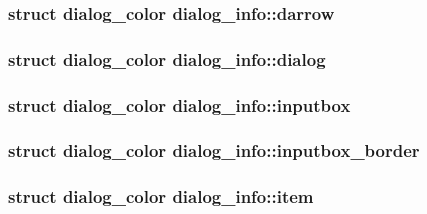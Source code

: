 \hypertarget{structdialog__info_a7e5d0d84cd0b3acd8805bfe8586d3f8e}{
\subsubsection[{darrow}]{\setlength{\rightskip}{0pt plus 5cm}struct {\bf dialog\-\_\-color} dialog\-\_\-info\-::darrow}}\label{structdialog__info_a7e5d0d84cd0b3acd8805bfe8586d3f8e}
\hypertarget{structdialog__info_a0b2621037998c327e6a4a4ea9a6edd0d}{
\subsubsection[{dialog}]{\setlength{\rightskip}{0pt plus 5cm}struct {\bf dialog\-\_\-color} dialog\-\_\-info\-::dialog}}\label{structdialog__info_a0b2621037998c327e6a4a4ea9a6edd0d}
\hypertarget{structdialog__info_addbd87e943da6bb0040fa62a45abd0ed}{
\subsubsection[{inputbox}]{\setlength{\rightskip}{0pt plus 5cm}struct {\bf dialog\-\_\-color} dialog\-\_\-info\-::inputbox}}\label{structdialog__info_addbd87e943da6bb0040fa62a45abd0ed}
\hypertarget{structdialog__info_a6f71cf10f00154ddb7485b217d92f8a7}{
\subsubsection[{inputbox\-\_\-border}]{\setlength{\rightskip}{0pt plus 5cm}struct {\bf dialog\-\_\-color} dialog\-\_\-info\-::inputbox\-\_\-border}}\label{structdialog__info_a6f71cf10f00154ddb7485b217d92f8a7}
\hypertarget{structdialog__info_acbc81039e9485672d07965f49388505d}{
\subsubsection[{item}]{\setlength{\rightskip}{0pt plus 5cm}struct {\bf dialog\-\_\-color} dialog\-\_\-info\-::item}}\label{structdialog__info_acbc81039e9485672d07965f49388505d}
